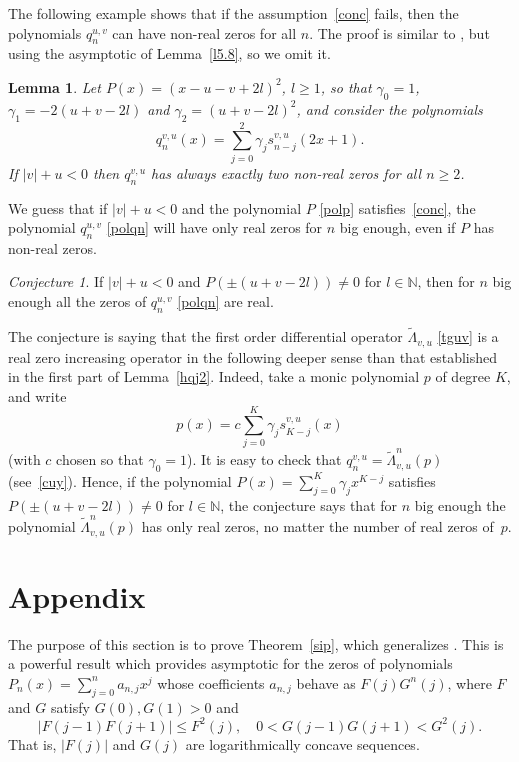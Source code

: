 \documentclass[10pt, a4paper, leqno]{amsart}
\numberwithin{equation}{section}
\theoremstyle{plain}
\newtheorem{Lem}[Theo]{Lemma}
\theoremstyle{remark}
\newtheorem*{Conj}{Conjecture}
\newcommand{\NN}{\mathbb{N}}
\newcommand{\scvu}{s^{v,u}}
\begin{document}
The following example shows that if the assumption~\eqref{conc} fails, then the polynomials
$q_n^{u,v}$ can have non-real zeros for all $n$. The proof is similar to \cite[Lemma 10]{Duran-Bell}, but using the asymptotic of Lemma~\ref{l5.8}, so we omit it.

\begin{Lem}
Let $P(x) = (x-u-v+2l)^2$, $l\ge 1$, so that $\gamma_0=1$, $\gamma_1=-2(u+v-2l)$ and $\gamma_2=(u+v-2l)^2$, and consider the polynomials
\[
  q_n^{v,u}(x) = \sum_{j=0}^2 \gamma_j\scvu_{n-j}(2x+1).
\]
If $|v|+u<0$ then $q_n^{v,u}$ has always exactly two non-real zeros for all $n\ge 2$.
\end{Lem}

We guess that if $|v|+u<0$ and the polynomial $P$ \eqref{polp} satisfies~\eqref{conc}, the polynomial $q_n^{u,v}$ \eqref{polqn} will have only real zeros for $n$ big enough, even if $P$ has non-real zeros.

\begin{Conj}
If $|v|+u<0$ and $P(\pm(u+v-2l)) \ne 0$ for $l\in \NN$, then for $n$ big enough all the zeros of $q_n^{u,v}$ \eqref{polqn} are real.
\end{Conj}

The conjecture is saying that the first order differential operator
$\tilde \Lambda_{v,u}$ \eqref{tguv} is a real zero increasing operator in the following deeper sense than that established in the first part of Lemma~\ref{hqj2}. Indeed, take a monic polynomial $p$ of degree $K$, and write
\[
  p(x) = c\sum_{j=0}^K \gamma_j \scvu_{K-j}(x)
\]
(with $c$ chosen so that $\gamma_0=1$). It is easy to check that $q_n^{v,u} = \tilde \Lambda_{v,u}^n(p)$ (see~\eqref{cuy}).
Hence, if the polynomial $P(x) = \sum_{j=0}^K \gamma_{j}x^{K-j}$ satisfies $P(\pm(u+v-2l)) \ne 0$ for $l\in \NN$, the conjecture says that for $n$ big enough the polynomial $\tilde \Lambda_{v,u}^n(p)$ has only real zeros, no matter the number of real zeros of~$p$.

\section{Appendix}

The purpose of this section is to prove Theorem~\ref{sip}, which generalizes \cite[Theorem~4]{dzb}. This is a powerful result which provides asymptotic for the zeros
of polynomials $P_n(x) = \sum_{j=0}^n a_{n,j}x^j$
whose coefficients $a_{n,j}$ behave as $F(j)G^n(j)$, where $F$ and $G$ satisfy
$G(0),G(1)>0$ and
\[
  |F(j-1)F(j+1)|\le F^2(j),\quad 0 < G(j-1)G(j+1) < G^2(j).
\]
That is, $|F(j)|$ and $G(j)$ are logarithmically concave sequences.
\end{document}
